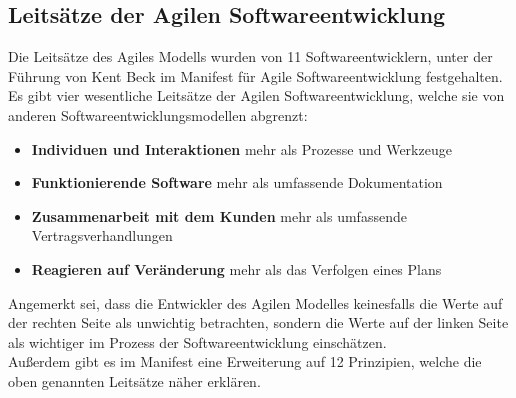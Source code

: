 \documentclass[a4paper, 10pt]{scrartcl}
\begin{document}
\subsection{Leitsätze der Agilen Softwareentwicklung}
Die Leitsätze des Agiles Modells wurden von 11 Softwareentwicklern, unter der Führung von Kent Beck im \glqq{}Manifest für Agile Softwareentwicklung\grqq{} festgehalten. Es gibt vier wesentliche Leitsätze der Agilen Softwareentwicklung, welche sie von \\anderen Softwareentwicklungsmodellen abgrenzt:
\begin{itemize}
\item \glqq{}\textbf{Individuen und Interaktionen} mehr als Prozesse und Werkzeuge\grqq{} \cite{Beck2013} 
\item \glqq{}\textbf{Funktionierende Software} mehr als umfassende Dokumentation\grqq{} \cite{Beck2013} 
\item \glqq{}\textbf{Zusammenarbeit mit dem Kunden} mehr als umfassende Vertragsverhandlungen\grqq{} \cite{Beck2013} 
\item \glqq{}\textbf{Reagieren auf Veränderung} mehr als das Verfolgen eines Plans\grqq{} \cite{Beck2013} 
\end{itemize}
Angemerkt sei, dass die Entwickler des Agilen Modelles keinesfalls die Werte auf der rechten Seite als unwichtig betrachten, sondern die Werte auf der linken Seite als wichtiger im Prozess der Softwareentwicklung einschätzen.\\
Außerdem gibt es im Manifest eine Erweiterung auf 12 Prinzipien, welche die oben genannten Leitsätze näher erklären.\citep{Beck2013} 
\end{document}

